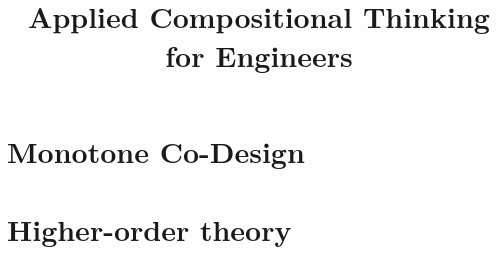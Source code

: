 \title{Applied Compositional Thinking\\ for Engineers}
\date{}



\setcounter{tocdepth}{1}
\tableofcontents








\book{
    
}









\book{
    
}


\part{Monotone Co-Design}\label{part:co-design}



















    \part{Higher-order theory}\label{part:higher-order}

